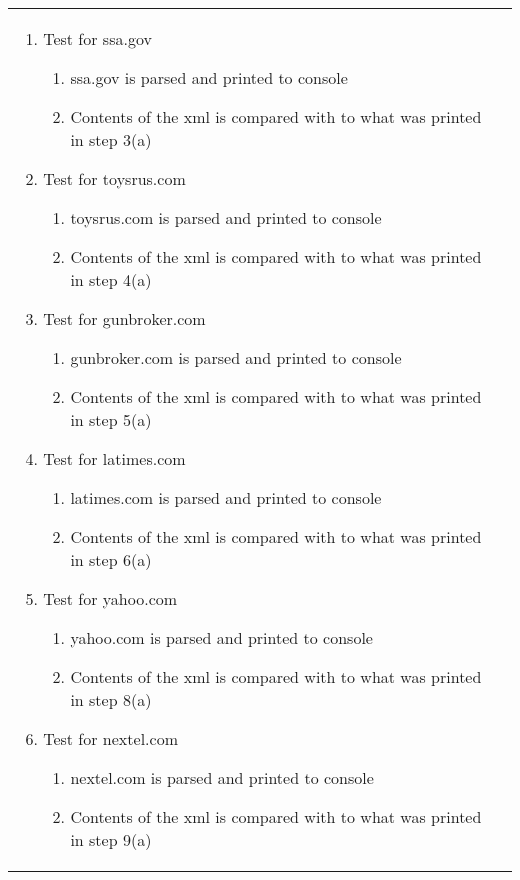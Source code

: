 \begin{center}
\begin{longtable}{ | p{4cm} | p{10cm} | }
\begin{enumerate}
							\item Test for ssa.gov
							\begin{enumerate}
								\item ssa.gov is parsed and printed to console
								\item Contents of the xml is compared with to what was printed in step 3(a)
							\end{enumerate}

							\item Test for toysrus.com
							\begin{enumerate}
								\item toysrus.com is parsed and printed to console
								\item Contents of the xml is compared with to what was printed in step 4(a)
							\end{enumerate}

							\item Test for gunbroker.com
							\begin{enumerate}
								\item gunbroker.com is parsed and printed to console
								\item Contents of the xml is compared with to what was printed in step 5(a)
							\end{enumerate}

							\item Test for latimes.com
							\begin{enumerate}
								\item latimes.com is parsed and printed to console
								\item Contents of the xml is compared with to what was printed in step 6(a)
							\end{enumerate}

							\item  Test for yahoo.com
							\begin{enumerate}
								\item yahoo.com is parsed and printed to console
								\item Contents of the xml is compared with to what was printed in step 8(a)
							\end{enumerate}

							\item Test for nextel.com
							\begin{enumerate}
								\item nextel.com is parsed and printed to console
								\item Contents of the xml is compared with to what was printed in step 9(a)
							\end{enumerate}


\end{enumerate}
\end{longtable}
\end{center}
